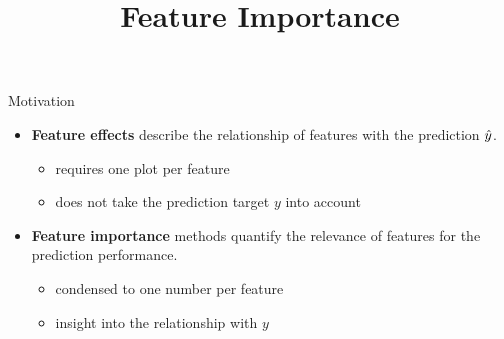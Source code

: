 \documentclass[11pt,compress,t,notes=noshow, xcolor=table]{beamer}
\title{Feature Importance}
\institute{\href{https://compstat-lmu.github.io/lecture_i2ml/}{compstat-lmu.github.io/lecture\_i2ml}}
\date{}
\begin{document}
	
	
	
	
	
	
	
	
	
	

\begin{vbframe}{Motivation}
\begin{itemize}
  \item \textbf{Feature effects} describe the relationship of features with the prediction $\yh$.
  \begin{itemize}
    \item requires one plot per feature
    \item does not take the prediction target $y$ into account
  \end{itemize}
  \item \textbf{Feature importance} methods quantify the relevance of features for the prediction performance.
  \begin{itemize}
    \item condensed to one number per feature
    \item insight into the relationship with $y$
  \end{itemize}
\end{itemize}

\end{vbframe}
\end{document}
